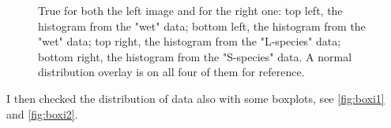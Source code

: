 \documentclass{article}
\begin{document}
\fi
\begin{figure}[H]
     \centering
     \caption{True for both the left image and for the right one: top left, the histogram from the "wet" data; bottom left, the histogram from the "wet" data; top right, the histogram from the "L-species" data; bottom right, the histogram from the "S-species" data. A normal distribution overlay is on all four of them for reference.}
      \qquad
\end{figure}
I then checked the distribution of data also with some boxplots, see \autoref{fig:boxi1} and \autoref{fig:boxi2}.
\end{document}
